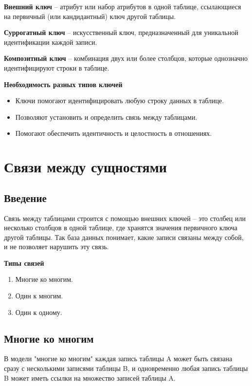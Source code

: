 \documentclass[a4paper,12pt]{report}
\begin{document}
\textbf{Внешний ключ} -- атрибут или набор атрибутов в одной таблице, ссылающиеся на первичный (или кандидантный) ключ другой таблицы.

\textbf{Суррогатный ключ} -- искусственный ключ, предназначенный для уникальной идентификации каждой записи.

\textbf{Композитный ключ} -- комбинация двух или более столбцов, которые однозначно идентифицируют строки в таблице.

\textbf{Необходимость разных типов ключей}
\begin{itemize}
    \item
        Ключи помогают идентифицировать любую строку данных в таблице. 
    \item
        Позволяют установить и определить связь между таблицами.
    \item
        Помогают обеспечить идентичность и целостность в отношениях.
\end{itemize}

\section{Связи между сущностями}

\subsection{Введение}

Связь между таблицами строится с помощью внешних ключей -- это столбец или несколько столбцов в одной таблице, 
где хранятся значения первичного ключа другой таблицы. Так база данных понимает, какие записи связаны между собой, 
и не позволяет нарушить эту связь.

\textbf{Типы связей}
\begin{enumerate}
    \item
        Многие ко многим.
    \item
        Один к многим.
    \item
        Один к одному.
\end{enumerate}

\subsection{Многие ко многим}

В модели "многие ко многим" каждая запись таблицы A может быть связана сразу с несколькими записями таблицы B, 
и одновременно любая запись таблицы B может иметь ссылки на множество записей таблицы A.
\end{document}
